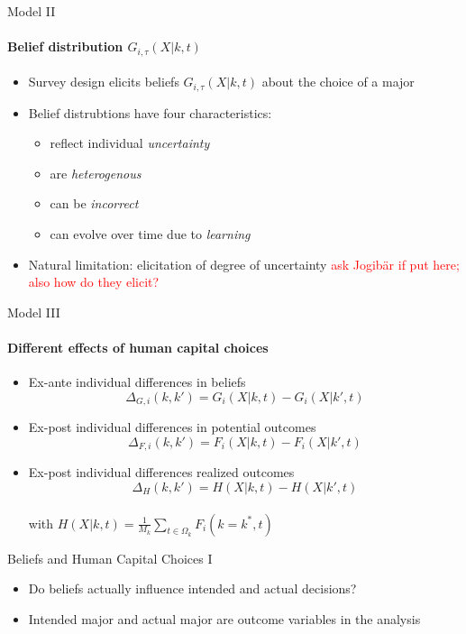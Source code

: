 \documentclass[12pt]{beamer}
\begin{document}
\begin{frame}{Model II}
    \framesubtitle{Belief distribution $G_{i,\tau}(X|k,t)$}
    \begin{itemize}
        \item Survey design elicits beliefs $G_{i,\tau}(X|k,t)$ about the choice of a major
        \item Belief distrubtions have four characteristics:
        \begin{itemize}
            \item reflect individual \textit{uncertainty}
            \item are \textit{heterogenous}
            \item can be \textit{incorrect}
            \item can evolve over time due to \textit{learning}
        \end{itemize}
        \item Natural limitation: elicitation of degree of uncertainty \textcolor{red}{ask Jogibär if put here; also how do they elicit?}
    \end{itemize}
\end{frame}

\begin{frame}{Model III}
    \framesubtitle{Different effects of human capital choices}
    \begin{itemize}
        \item Ex-ante individual differences in beliefs
        $$ \Delta_{G,i}(k,k') = G_i(X|k,t) - G_i(X|k',t) $$
        \item Ex-post individual differences in potential outcomes
        $$ \Delta_{F,i}(k,k') = F_i(X|k,t) - F_i(X|k',t) $$
        \item Ex-post individual differences realized outcomes
        $$ \Delta_{H}(k,k') = H(X|k,t) - H(X|k',t) $$ \\
        with $H(X|k,t) = \frac{1}{M_k} \sum_{t \in \Omega_k} F_i(k = k^*,t)$
    \end{itemize}
    
\end{frame}

\begin{frame}{Beliefs and Human Capital Choices I}
    \begin{itemize}
        \item Do beliefs actually influence intended and actual decisions?
        \item Intended major and actual major are outcome variables in the analysis
    \end{itemize}  
\end{frame}
\end{document}

